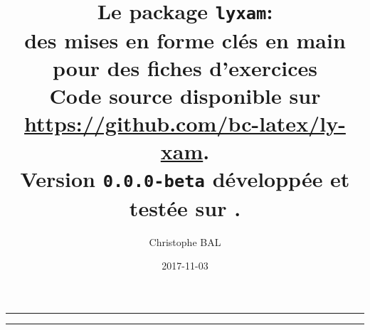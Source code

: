 \documentclass[12pt,a4paper]{article}
\begin{document}
\title{%
	Le package \texttt{lyxam}:\\%
	des mises en forme clés en main\\%
	pour des fiches d'exercices\\%
	{\footnotesize Code source disponible sur \url{https://github.com/bc-latex/ly-xam}.}\\%
	{\footnotesize Version \texttt{0.0.0-beta} développée et testée sur \macosxname{}.}%
}
\author{Christophe BAL}
\date{2017-11-03}

\maketitle


\vspace{2em}

\hrule

\tableofcontents

\vspace{1.5em}

\hrule

\newpage

\end{document}
